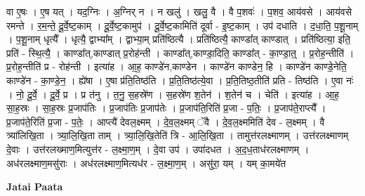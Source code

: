 \documentclass[17pt]{extarticle}
\begin{document}
वा ए॒षः । ए॒ष यत् । यद॒ग्निः । अ॒ग्निर् न । न खलु॑ । खलु॒ वै । वै प॒शवः॑ । प॒शव॒ आय॑वसे । आय॑वसे रमन्ते । र॒म॒न्ते॒ दू॒र्वे॒ष्ट॒काम् । दू॒र्वे॒ष्ट॒कामुप॑ । दू॒र्वे॒ष्ट॒कामिति॑ दूर्वा - इ॒ष्ट॒काम् । उप॑ दधाति । द॒धा॒ति॒ प॒शू॒नाम् । 
प॒शू॒नाम् धृत्यै᳚ । धृत्यै॒ द्वाभ्या᳚म् । द्वाभ्या॒म् प्रति॑ष्ठित्यै । प्रति॑ष्ठित्यै॒ काण्डा᳚त् काण्डात् । प्रति॑ष्ठित्या॒ इति॒ प्रति॑ - स्थि॒त्यै॒ । काण्डा᳚त्,काण्डात् प्र॒रोह॑न्ती । काण्डा᳚त्,काण्डा॒दिति॒ काण्डा᳚त् - का॒ण्डा॒त्॒ । प्र॒रोह॒न्तीति॑ । प्र॒रोह॒न्तीति॑ प्र - रोह॑न्ती । इत्या॑ह । आ॒ह॒ काण्डे॑न,काण्डेन । काण्डे॑न काण्डेन॒ हि । काण्डे॑न काण्डे॒नेति॒ काण्डे॑न - का॒ण्डे॒न॒ । ह्ये॑षा । ए॒षा प्र॑ति॒तिष्ठ॑ति । प्र॒ति॒तिष्ठ॑त्ये॒वा । प्र॒ति॒तिष्ठ॒तीति॑ प्रति - तिष्ठ॑ति । ए॒वा नः॑ । नो॒ दू॒र्वे॒ । दू॒र्वे॒ प्र । प्र त॑नु । त॒नु॒ स॒हस्रे॑ण । स॒हस्रे॑ण श॒तेन॑ । श॒तेन॑ च । चेति॑ । इत्या॑ह । आ॒ह॒ सा॒ह॒स्रः । सा॒ह॒स्रः प्र॒जाप॑तिः । प्र॒जाप॑तिः प्र॒जाप॑तेः । प्र॒जाप॑ति॒रिति॑ प्र॒जा - प॒तिः॒ । प्र॒जाप॑ते॒राप्त्यै᳚ । प्र॒जाप॑ते॒रिति॑ प्र॒जा - प॒तेः॒ । आप्त्यै॑ देवल॒क्ष्मम् । दे॒व॒ल॒क्ष्मम् ॅवै । दे॒व॒ल॒क्ष्ममिति॑ देव - ल॒क्ष्मम् । वै त्र्या॑लिखि॒ता । त्र्या॒लि॒खि॒ता ताम् । त्र्या॒लि॒खि॒तेति॑ त्रि - आ॒लि॒खि॒ता । तामुत्त॑रलक्ष्माणम् । उत्त॑रलक्ष्माणम् दे॒वाः । उत्त॑रलख्माण॒मित्युत्त॑र - ल॒क्ष्मा॒ण॒म् । दे॒वा उप॑ । उपा॑दधत । अ॒द॒ध॒ताध॑रलक्ष्माणम् । अध॑रलक्ष्माण॒मसु॑राः । अध॑रलक्ष्माण॒मित्यध॑र - ल॒क्ष्मा॒ण॒म् । असु॑रा॒ यम् । यम् का॒मये॑त \newline

\textbf{Jatai Paata} \newline
\end{document}
